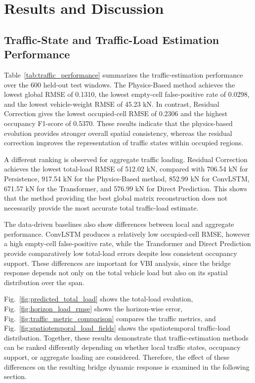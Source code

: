 \documentclass[journal]{IEEEtran}
\begin{document}
\section{Results and Discussion}

\subsection{Traffic-State and Traffic-Load Estimation Performance}
\label{sec:traffic_results}

Table~\ref{tab:traffic_performance} summarizes the
traffic-estimation performance over the 600 held-out test windows. The
Physics-Based method achieves the lowest global RMSE of 0.1310, the lowest
empty-cell false-positive rate of 0.0298, and the lowest vehicle-weight RMSE of
45.23 kN. In contrast, Residual Correction gives the lowest occupied-cell RMSE
of 0.2306 and the highest occupancy F1-score of 0.5370. These results indicate
that the physics-based evolution provides stronger overall spatial consistency,
whereas the residual correction improves the representation of traffic states
within occupied regions.

A different ranking is
observed for aggregate traffic loading. Residual Correction achieves the lowest
total-load RMSE of 512.02 kN, compared with 706.54 kN for Persistence, 917.54
kN for the Physics-Based method, 852.99 kN for ConvLSTM, 671.57 kN for the
Transformer, and 576.99 kN for Direct Prediction. This shows that the method
providing the best global matrix reconstruction does not necessarily provide
the most accurate total traffic-load estimate.

The data-driven baselines
also show differences between local and aggregate performance. ConvLSTM
produces a relatively low occupied-cell RMSE, however a high empty-cell
false-positive rate, while the Transformer and Direct Prediction provide
comparatively low total-load errors despite less consistent occupancy support.
These differences are important for VBI analysis, since the bridge response
depends not only on the total vehicle load but also on its spatial distribution
over the span.

Fig.~\ref{fig:predicted_total_load} shows the total-load evolution, Fig.~\ref{fig:horizon_load_rmse} shows the horizon-wise error, Fig.~\ref{fig:traffic_metric_comparison} compares the traffic metrics, and Fig.~\ref{fig:spatiotemporal_load_fields} shows the spatiotemporal traffic-load distribution. Together, these
results demonstrate that traffic-estimation methods can be ranked differently
depending on whether local traffic states, occupancy support, or aggregate
loading are considered. Therefore, the effect of these differences on the
resulting bridge dynamic response is examined in the following section.
\end{document}
